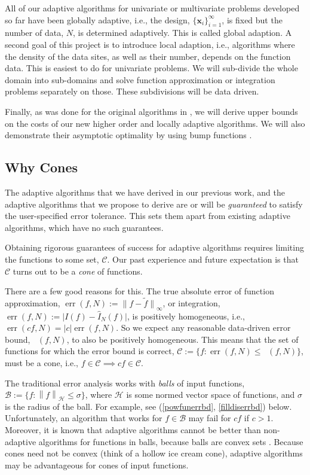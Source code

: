 \documentclass[11pt]{NSFamsart}
\newcommand{\hI}{\hat{I}}
\newcommand{\tf}{\tilde{f}}
\DeclareMathOperator{\err}{err}
\DeclareMathOperator{\oerr}{\overline{\err}}
\newcommand{\bx}{{\boldsymbol{x}}}
\newcommand{\cb}{\mathcal{B}}
\newcommand{\calc}{{\mathcal{C}}}
\def\abs#1{\ensuremath{\left \lvert #1 \right \rvert}}
\newcommand{\bigabs}[1]{\ensuremath{\bigl \lvert #1 \bigr \rvert}}
\newcommand{\norm}[2][{}]{\ensuremath{\left \lVert #2 \right \rVert}_{#1}}
\newcommand{\bignorm}[2][{}]{\ensuremath{\bigl \lVert #2 \bigr \rVert}_{#1}}
\newcommand{\desinf}{\{\bx_i\}_{i=1}^{\infty}}
\newcommand{\ch}{\mathcal{H}}
\begin{document}
All of our adaptive algorithms for univariate or multivariate problems developed so far have been globally adaptive, i.e., the design, $\desinf$, is fixed but the number of data, $N$, is determined adaptively.  This is called global adaption.  A second goal of this project  is to introduce local adaption, i.e., algorithms where the density of the data sites, as well as their number, depends on the function data.  This is easiest to do for univariate problems.  We will sub-divide the whole domain into sub-domains and solve function approximation or integration problems separately on those.  These subdivisions will be data driven.

Finally, as was done for the original algorithms in \citep{HicEtal14b}, we will derive upper bounds on the costs of our new higher order and locally adaptive algorithms.  We will also demonstrate their asymptotic optimality by using bump functions \cite{Nov88,TraWasWoz88}.

\subsection*{Why Cones} The adaptive algorithms that we have derived in our previous work, and the adaptive algorithms that we propose to derive are or will be \emph{guaranteed} to satisfy the user-specified error tolerance.  This sets them apart from existing adaptive algorithms, which have no such guarantees.

Obtaining rigorous guarantees of success for adaptive algorithms requires limiting the functions to some set, $\calc$.  Our past experience and future expectation is that $\calc$ turns out to be a \emph{cone} of functions.

There are a few good reasons for this. The true absolute error of function approximation, $\err(f,N):=\bignorm[\infty]{f-\tf}$, or integration, $\err(f,N):= \bigabs{I(f) - \hI_N(f)}$, is positively homogeneous, i.e., $\err(cf,N)=\abs{c} \err(f,N)$. So we expect any reasonable data-driven error bound, $\oerr(f,N)$, to also be positively homogeneous.  This means that the set of functions for which the error bound is correct, $\calc:=\{f : \err(f,N) \le \oerr(f,N)\}$, must be a cone, i.e., $f\in \calc \implies cf \in \calc$.

The traditional error analysis works with \emph{balls} of input functions, $\cb :=\{ f : \norm[\ch]{f} \le \sigma\}$, where $\ch$ is some normed vector space of functions, and $\sigma$ is the radius of the ball.  For example, see (\ref{powfunerrbd}, \ref{filldiserrbd}) below.  Unfortunately, an algorithm that works for $f \in \cb$ may fail for $c f$ if $c>1$.  Moreover, it is known that adaptive algorithms cannot be better than non-adaptive algorithms for functions in balls, because balls are convex sets \cite[Chapter 4, Theorem 5.2.1]{TraWasWoz88}. Because cones need not be convex (think of a hollow ice cream cone), adaptive algorithms may be advantageous for cones of input functions.
\end{document}
